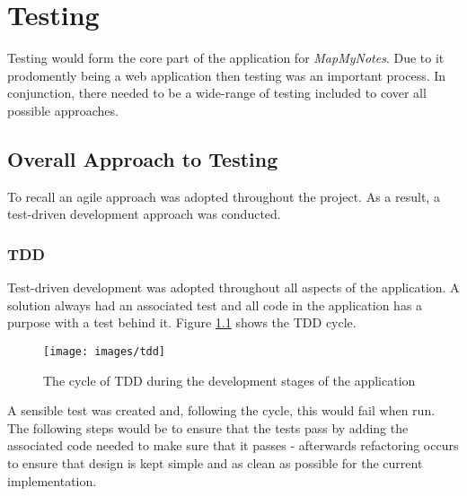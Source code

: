 \chapter{Testing}




Testing would form the core part of the application for \textit{MapMyNotes}. Due to it prodomently being a web application then testing was an important process. In conjunction, there needed to be a wide-range of testing included to cover all possible approaches.

\section{Overall Approach to Testing}
To recall an agile approach was adopted throughout the project. As a result, a test-driven development approach was conducted.

\subsection{TDD}
Test-driven development was adopted throughout all aspects of the application. A solution always had an associated test and all code in the application has a purpose with a test behind it. Figure \ref{fig:tdd} shows the TDD cycle.

\begin{figure}
  \texttt{[image: images/tdd]}
  \centering
  \caption{The cycle of TDD during the development stages of the application}
  \label{fig:tdd}
\end{figure}

A sensible test was created and, following the cycle, this would fail when run. The following steps would be to ensure that the tests pass by adding the associated code needed to make sure that it passes - afterwards refactoring occurs to ensure that design is kept simple and as clean as possible for the current implementation.

